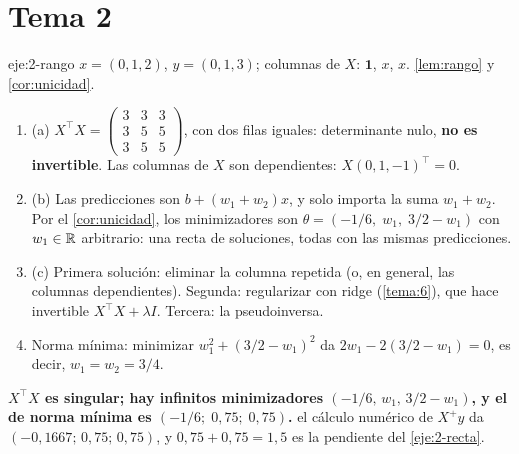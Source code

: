\section{Tema 2}

\begin{solucion}{eje:2-rango}
\datos $x=(0,1,2)$, $y=(0,1,3)$; columnas de $X$: $\mathbf{1}$, $x$, $x$.
\planteamiento \cref{lem:rango} y \cref{cor:unicidad}.
\pasos
\begin{enumerate}[label=\arabic*.]
  \item (a) $X^{\top}X=\begin{pmatrix}3&3&3\\3&5&5\\3&5&5\end{pmatrix}$, con dos filas iguales: determinante nulo, \textbf{no es invertible}. Las columnas de $X$ son dependientes: $X(0,1,-1)^{\top}=0$.
  \item (b) Las predicciones son $b+(w_1+w_2)x$, y solo importa la suma $w_1+w_2$. Por el \cref{cor:unicidad}, los minimizadores son $\theta=(-1/6,\;w_1,\;3/2-w_1)$ con $w_1\in\mathbb{R}$ arbitrario: una recta de soluciones, todas con las mismas predicciones.
  \item (c) Primera solución: eliminar la columna repetida (o, en general, las columnas dependientes). Segunda: regularizar con ridge (\cref{tema:6}), que hace invertible $X^{\top}X+\lambda I$. Tercera: la pseudoinversa.
  \item Norma mínima: minimizar $w_1^{2}+(3/2-w_1)^{2}$ da $2w_1-2(3/2-w_1)=0$, es decir, $w_1=w_2=3/4$.
\end{enumerate}
\resultado \textbf{$X^{\top}X$ es singular; hay infinitos minimizadores $(-1/6,\,w_1,\,3/2-w_1)$, y el de norma mínima es $(-1/6;\;0{,}75;\;0{,}75)$.}
\comprobacion el cálculo numérico de $X^{+}y$ da $(-0{,}1667;\,0{,}75;\,0{,}75)$, y $0{,}75+0{,}75=1{,}5$ es la pendiente del \cref{eje:2-recta}.
\end{solucion}

